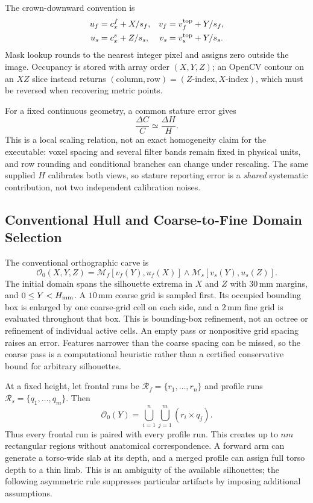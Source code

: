 The crown-downward convention is
\begin{align}
u_f&=c_x^f+X/s_f,&v_f&=v_f^{\rm top}+Y/s_f,\nonumber\\
u_s&=c_x^s+Z/s_s,&v_s&=v_s^{\rm top}+Y/s_s.
\label{eq:projection_coordinates}
\end{align}
Mask lookup rounds to the nearest integer pixel and assigns zero outside the image. Occupancy is stored with array order $(X,Y,Z)$; an OpenCV contour on an $XZ$ slice instead returns $(\text{column},\text{row})=(Z\text{-index},X\text{-index})$, which must be reversed when recovering metric points.

For a fixed continuous geometry, a common stature error gives
\begin{equation}
\frac{\Delta C}{C}\simeq\frac{\Delta H}{H}.
\label{eq:scale_prop}
\end{equation}
This is a local scaling relation, not an exact homogeneity claim for the executable: voxel spacing and several filter bands remain fixed in physical units, and row rounding and conditional branches can change under rescaling. The same supplied $H$ calibrates both views, so stature reporting error is a \emph{shared} systematic contribution, not two independent calibration noises.

\subsection{Conventional Hull and Coarse-to-Fine Domain Selection}
\label{subsec:carving}
The conventional orthographic carve is
\begin{equation}
\mathcal O_0(X,Y,Z)=\mathcal M_f[v_f(Y),u_f(X)]\wedge\mathcal M_s[v_s(Y),u_s(Z)].
\label{eq:cartesian_carve}
\end{equation}
The initial domain spans the silhouette extrema in $X$ and $Z$ with $30$\,mm margins, and $0\le Y<H_{\rm mm}$. A $10$\,mm coarse grid is sampled first. Its occupied bounding box is enlarged by one coarse-grid cell on each side, and a $2$\,mm fine grid is evaluated throughout that box. This is bounding-box refinement, not an octree or refinement of individual active cells. An empty pass or nonpositive grid spacing raises an error. Features narrower than the coarse spacing can be missed, so the coarse pass is a computational heuristic rather than a certified conservative bound for arbitrary silhouettes.

At a fixed height, let frontal runs be $\mathcal R_f=\{r_1,\ldots,r_n\}$ and profile runs $\mathcal R_s=\{q_1,\ldots,q_m\}$. Then
\begin{equation}
\mathcal O_0(Y)=\bigcup_{i=1}^n\bigcup_{j=1}^m(r_i\times q_j).
\end{equation}
Thus every frontal run is paired with every profile run. This creates up to $nm$ rectangular regions without anatomical correspondence. A forward arm can generate a torso-wide slab at its depth, and a merged profile can assign full torso depth to a thin limb. This is an ambiguity of the available silhouettes; the following asymmetric rule suppresses particular artifacts by imposing additional assumptions.

